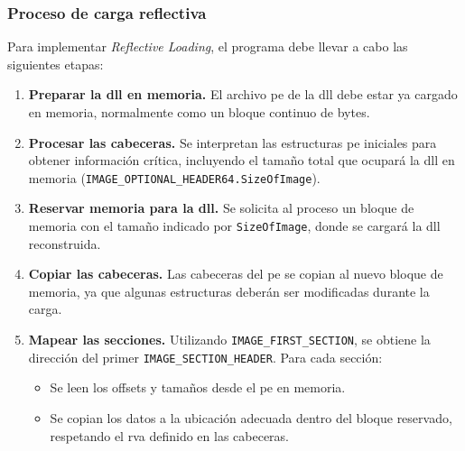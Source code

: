 \subsubsection*{Proceso de carga reflectiva}
\label{sec:reflective}

Para implementar \textit{Reflective Loading}, el programa debe llevar a cabo las siguientes etapas:

\begin{enumerate}
    \item \textbf{Preparar la \acrshort{dll} en memoria.}  
    El archivo \acrshort{pe} de la \acrshort{dll} debe estar ya cargado en memoria, normalmente como un bloque continuo de bytes.

    \item \textbf{Procesar las cabeceras.}  
    Se interpretan las estructuras \acrshort{pe} iniciales para obtener información crítica, incluyendo el tamaño total que ocupará la \acrshort{dll} en memoria (\texttt{IMAGE\_OPTIONAL\_HEADER64.SizeOfImage}).

    \item \textbf{Reservar memoria para la \acrshort{dll}.}  
    Se solicita al proceso un bloque de memoria con el tamaño indicado por \texttt{SizeOfImage}, donde se cargará la \acrshort{dll} reconstruida.

    \item \textbf{Copiar las cabeceras.}  
    Las cabeceras del \acrshort{pe} se copian al nuevo bloque de memoria, ya que algunas estructuras deberán ser modificadas durante la carga.

    \item \textbf{Mapear las secciones.}  
    Utilizando \texttt{IMAGE\_FIRST\_SECTION}, se obtiene la dirección del primer \texttt{IMAGE\_SECTION\_HEADER}.  
    Para cada sección:
    \begin{itemize}
        \item Se leen los offsets y tamaños desde el \acrshort{pe} en memoria.
        \item Se copian los datos a la ubicación adecuada dentro del bloque reservado, respetando el \acrshort{rva} definido en las cabeceras.
    \end{itemize}


\end{enumerate}
